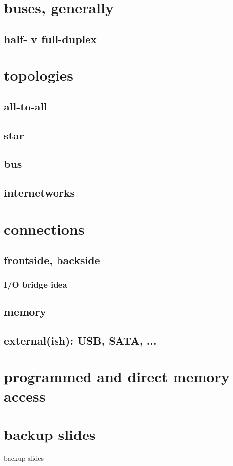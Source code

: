\date{}
\title{}
\date{}

\begin{frame}
    \titlepage
\end{frame}

\section{buses, generally}

\subsection{half- v full-duplex}

\section{topologies}

\subsection{all-to-all}

\subsection{star}

\subsection{bus}

\subsection{internetworks}

\section{connections}

\subsection{frontside, backside}

\subsubsection{I/O bridge idea}

\subsection{memory}

\subsection{external(ish): USB, SATA, ...}

\section{programmed and direct memory access}


\section{backup slides}
\begin{frame}{backup slides}
\end{frame}


